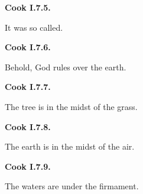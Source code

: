 \par\begin{minipage}{\linewidth}\raggedright
\textbf{Cook I.7.5.}

It was so called.

\end{minipage}\par\addvspace{4pt}

\par\begin{minipage}{\linewidth}\raggedright
\textbf{Cook I.7.6.}

Behold, God rules over the earth.

\end{minipage}\par\addvspace{4pt}

\par\begin{minipage}{\linewidth}\raggedright
\textbf{Cook I.7.7.}

The tree is in the midst of the grass.

\end{minipage}\par\addvspace{4pt}

\par\begin{minipage}{\linewidth}\raggedright
\textbf{Cook I.7.8.}

The earth is in the midst of the air.

\end{minipage}\par\addvspace{4pt}

\par\begin{minipage}{\linewidth}\raggedright
\textbf{Cook I.7.9.}

The waters are under the firmament.

\end{minipage}\par\addvspace{4pt}

